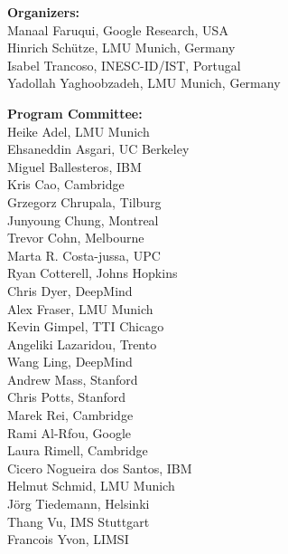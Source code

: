 \documentclass[11pt]{article}
\begin{document}

\vspace*{0.5cm}


\begin{description}
\item{\bf Organizers:}\vspace{2mm} \\
Manaal Faruqui, Google Research, USA\\
Hinrich Schütze, LMU Munich, Germany \\
Isabel Trancoso, INESC-ID/IST, Portugal \\
Yadollah Yaghoobzadeh, LMU Munich, Germany 

\vspace{3mm}
\item{\bf Program Committee:}\vspace{2mm} \\
Heike Adel, LMU Munich \\
Ehsaneddin Asgari, UC Berkeley \\
Miguel Ballesteros, IBM \\
Kris Cao, Cambridge \\
Grzegorz Chrupala, Tilburg \\
Junyoung Chung, Montreal \\
Trevor Cohn, Melbourne \\
Marta R. Costa-jussa, UPC \\
Ryan Cotterell, Johns Hopkins \\
Chris Dyer, DeepMind \\
Alex Fraser, LMU Munich \\
Kevin Gimpel, TTI Chicago \\
Angeliki Lazaridou, Trento \\
Wang Ling, DeepMind \\
Andrew Mass, Stanford \\
Chris Potts, Stanford \\
Marek Rei, Cambridge \\
Rami Al-Rfou, Google \\
Laura Rimell, Cambridge \\
Cicero Nogueira dos Santos, IBM \\
Helmut Schmid, LMU Munich \\
Jörg Tiedemann, Helsinki \\
Thang Vu, IMS Stuttgart \\
Francois Yvon, LIMSI 


\end{description}
\end{document}
